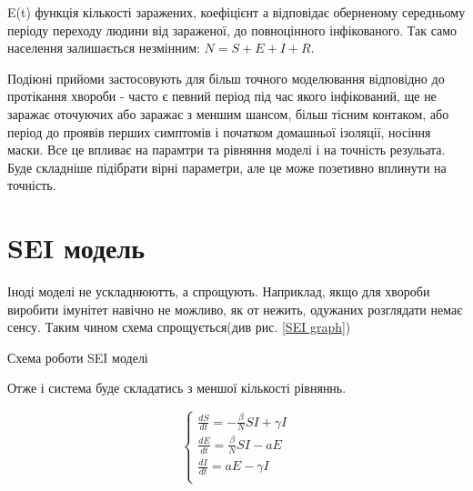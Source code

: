 E(t) функція кількості заражених, коефіцієнт а відповідає оберненому середньому періоду переходу людини від зараженої, до повноцінного інфікованого.
Так само населення залишається незмінним: $ N = S + E + I + R $.

Подіюні прийоми застосовують для більш точного моделювання відповідно до
протікання хвороби - часто є певний період під час якого інфікований, 
ще не заражає оточуючих або заражає з меншим шансом, більш тісним контаком, 
або період до проявів перших симптомів і початком домашньої ізоляції,
носіння маски. 
Все це впливає на парамтри та рівняння моделі і на точність резульата. 
Буде складніше підібрати вірні параметри, але це може позетивно вплинути на точність.

\section{SEI модель}

Іноді моделі не ускладнюютть, а спрощують. 
Наприклад, якщо для хвороби виробити імунітет навічно не можливо, 
як от нежить, одужаних розглядати немає сенсу. 
Таким чином схема спрощується(див рис. \ref{SEI graph})

\begin{risunok}[ht]
    \centering
    \vspace{0.5cm}
    \caption{Схема роботи SEI моделі}
    \label{SEI graph}
\end{risunok}

Отже і система буде складатись з меншої кількості рівняннь.

\begin{equation*}
    \begin{cases}
        \frac{dS}{dt} = - \frac{\beta}{N}SI + \gamma I \\
        \frac{dE}{dt} = \frac{\beta}{N}SI - aE         \\
        \frac{dI}{dt} = aE - \gamma I                  \\
    \end{cases}
\end{equation*}

